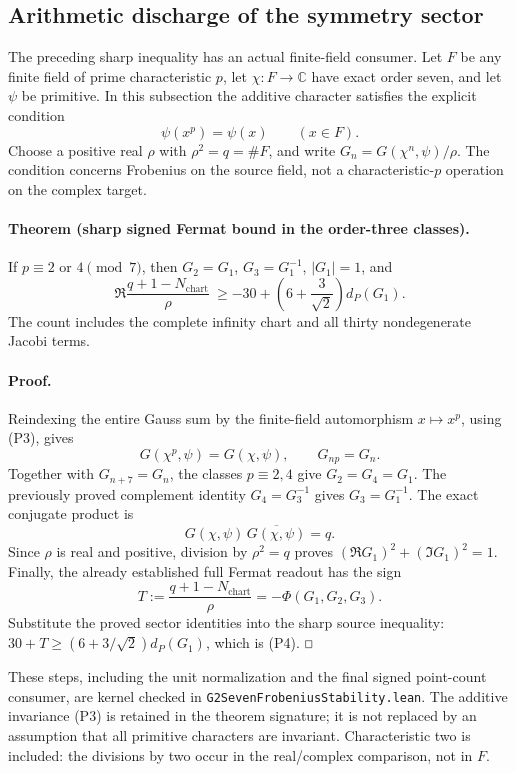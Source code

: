 \documentclass[11pt]{article}
\renewcommand{\square}{\mathord{\vcenter{\hrule\hbox{\vrule height .45em\kern .45em\vrule}\hrule}}}
\begin{document}
\subsection{Arithmetic discharge of the symmetry sector}

The preceding sharp inequality has an actual finite-field consumer.
Let \(F\) be any finite field of prime characteristic \(p\), let
\(\chi:F\to\mathbb C\) have exact order seven, and let \(\psi\) be
primitive. In this subsection the additive character satisfies the
explicit condition
\[
 \psi(x^p)=\psi(x)\qquad(x\in F).                         \tag{P3}
\]
Choose a positive real \(\rho\) with \(\rho^2=q=\#F\), and write
\(G_n=G(\chi^n,\psi)/\rho\).
The condition concerns Frobenius on the source field, not a
characteristic-\(p\) operation on the complex target.

\paragraph{Theorem (sharp signed Fermat bound in the order-three classes).}
If \(p\equiv2\) or \(4\pmod7\), then \(G_2=G_1\),
\(G_3=G_1^{-1}\), \(|G_1|=1\), and
\[
 \Re\frac{q+1-N_{\mathrm{chart}}}{\rho}
 \ \ge -30+\left(6+\frac3{\sqrt2}\right)d_P(G_1).          \tag{P4}
\]
The count includes the complete infinity chart and all thirty
nondegenerate Jacobi terms.

\paragraph{Proof.}
Reindexing the entire Gauss sum by the finite-field automorphism
\(x\mapsto x^p\), using (P3), gives
\[
 G(\chi^p,\psi)=G(\chi,\psi),\qquad G_{np}=G_n.
\]
Together with \(G_{n+7}=G_n\), the classes \(p\equiv2,4\)
give \(G_2=G_4=G_1\). The previously proved complement identity
\(G_4=G_3^{-1}\) gives \(G_3=G_1^{-1}\).
The exact conjugate product is
\[
 G(\chi,\psi)\,\overline{G(\chi,\psi)}=q.
\]
Since \(\rho\) is real and positive, division by \(\rho^2=q\)
proves \((\Re G_1)^2+(\Im G_1)^2=1\).
Finally, the already established full Fermat readout has the sign
\[
 T:=\frac{q+1-N_{\mathrm{chart}}}{\rho}
   =-\Phi(G_1,G_2,G_3).
\]
Substitute the proved sector identities into the sharp source inequality:
\(30+T\ge(6+3/\sqrt2)d_P(G_1)\), which is (P4).
\hfill$\square$

These steps, including the unit normalization and the final signed
point-count consumer, are kernel checked in
\texttt{G2SevenFrobeniusStability.lean}. The additive invariance (P3)
is retained in the theorem signature; it is not replaced by an assumption
that all primitive characters are invariant. Characteristic two is
included: the divisions by two occur in the real/complex comparison,
not in \(F\).
\end{document}
